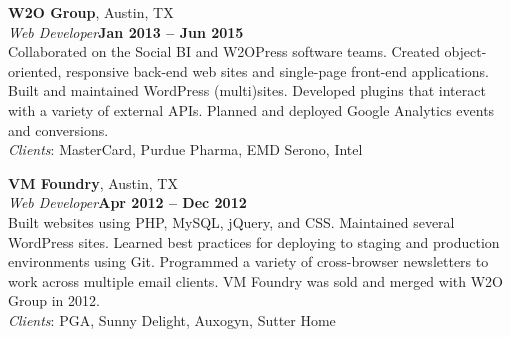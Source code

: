 \documentclass[margin,line]{resume}
\begin{document}
\begin{resume}
\textbf{W2O Group}, Austin, TX
\vspace{2mm}\\
\textsl{Web Developer}\hfill \textbf{Jan 2013 -- Jun 2015}\vspace{1mm}\\
Collaborated on the Social BI and W2OPress software teams. Created object-oriented, responsive back-end web sites and single-page front-end applications. Built and maintained WordPress (multi)sites. Developed plugins that interact with a variety of external APIs. Planned and deployed Google Analytics events and conversions.\vspace{1mm}\\
\textsl{Clients}: {\small MasterCard, Purdue Pharma, EMD Serono, Intel}


\textbf{VM Foundry}, Austin, TX
\vspace{2mm}\\
\textsl{Web Developer}\hfill \textbf{Apr 2012 -- Dec 2012}\vspace{1mm}\\
Built websites using PHP, MySQL, jQuery, and CSS. Maintained several WordPress sites. Learned best practices for deploying to staging and production environments using Git. Programmed a variety of cross-browser newsletters to work across multiple email clients. VM Foundry was sold and merged with W2O Group in 2012.\vspace{1mm}\\
\textsl{Clients}: {\small PGA, Sunny Delight, Auxogyn, Sutter Home}



\end{resume}
\end{document}
